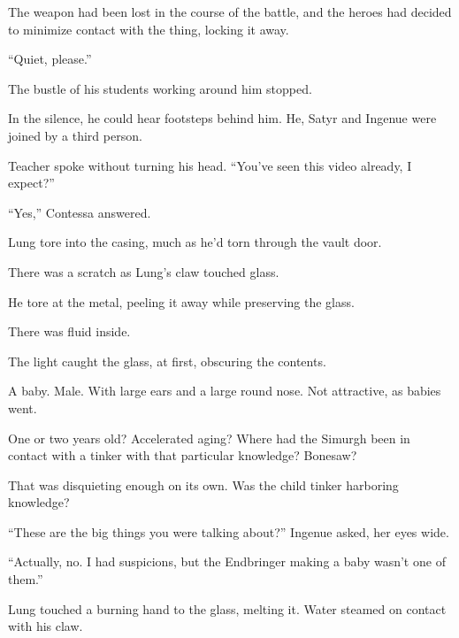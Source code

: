 The weapon had been lost in the course of the battle, and the heroes had decided to minimize contact with the thing, locking it away.



``Quiet, please.''



The bustle of his students working around him stopped.



In the silence, he could hear footsteps behind him.  He, Satyr and Ingenue were joined by a third person.



Teacher spoke without turning his head.  ``You've seen this video already, I expect?''



``Yes,'' Contessa answered.



Lung tore into the casing, much as he'd torn through the vault door.



There was a scratch as Lung's claw touched glass.



He tore at the metal, peeling it away while preserving the glass.



There was fluid inside.



The light caught the glass, at first, obscuring the contents.



A baby.  Male.  With large ears and a large round nose.  Not attractive, as babies went.



One or two years old?  Accelerated aging?  Where had the Simurgh been in contact with a tinker with that particular knowledge?  Bonesaw?



That was disquieting enough on its own.  Was the child tinker harboring knowledge?



``These are the big things you were talking about?''  Ingenue asked, her eyes wide.



``Actually, no.  I had suspicions, but the Endbringer making a baby wasn't one of them.''



Lung touched a burning hand to the glass, melting it.  Water steamed on contact with his claw.



